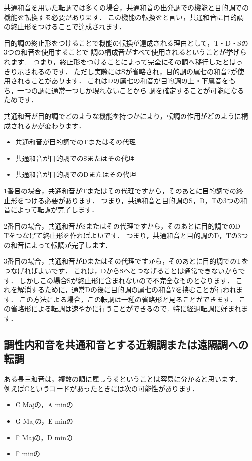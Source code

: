 \documentclass[dvipdfmx,uplatex,b5paper,openany,jbase=12Q,nomag*,textwidth-limit=44%
               ]{gachimuchi}[2020/05/05]
\begin{document}
共通和音を用いた転調では多くの場合，共通和音の出発調での機能と目的調での機能を転換する必要があります．
この機能の転換をと言い，共通和音に目的調の終止形をつけることで達成されます．
\begin{Yodan}%
目的調の終止形をつけることで機能の転換が達成される理由として，T・D・Sの3つの和音を使用することで%
調の構成音がすべて使用されるということが挙げられます．
つまり，終止形をつけることによって完全にその調へ移行したとはっきり示されるのです．
ただし実際にはSが省略され，目的調の属七の和音\Gnv\subsc7が使用されることがあります．
これはDの属七の和音が目的調の上・下属音をもち，一つの調に通常一つしか現れないことから
調を確定することが可能になるためです．
\end{Yodan}
共通和音が目的調でどのような機能を持つかにより，転調の作用がどのように構成されるかが変わります．
\begin{itemize}
  \item 共通和音が目的調でのTまたはその代理
  \item 共通和音が目的調でのSまたはその代理
  \item 共通和音が目的調でのDまたはその代理
\end{itemize}

1番目の場合，共通和音がTまたはその代理ですから，そのあとに目的調での終止形をつける必要があります．
つまり，共通和音と目的調のS，D，Tの3つの和音によって転調が完了します．

2番目の場合，共通和音がSまたはその代理ですから，そのあとに目的調でのD---Tをつなげて終止形を作ればよいです．
つまり，共通和音と目的調のD，Tの3つの和音によって転調が完了します．

3番目の場合，共通和音がDまたはその代理ですから，そのあとに目的調でのTをつなげればよいです．
これは，DからSへとつなげることは通常できないからです．
しかしこの場合Sが終止形に含まれないので不完全なものとなります．
これを解消するために，通常Dの後に目的調の属七の和音\Gnv\subsc7を挟むことが行われます．
この方法による場合，この転調は一種の省略形と見ることができます．
この省略形による転調は速やかに行うことができるので，特に経過転調に好まれます．

\subsection{調性内和音を共通和音とする近親調または遠隔調への転調}
ある長三和音は，複数の調に属しうるということは容易に分かると思います．
例えばCというコードがあったときには次の可能性があります．
\begin{itemize}
  \item C Majの\Gni ，A minの\bFlat\Gniii
  \item G Majの\Gniv ，E minの\bFlat\Gnvi
  \item F Majの\Gnv ，D minの\bFlat\Gnvii
  \item F minの\Gnv
\end{itemize}
\end{document}
